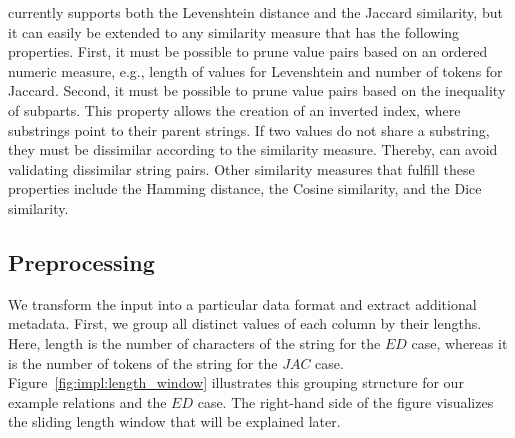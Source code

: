 \sawfish currently supports both the Levenshtein distance and the Jaccard similarity, but it can easily be extended to any similarity measure that has the following properties.
First, it must be possible to prune value pairs based on an ordered numeric measure, e.g., length of values for Levenshtein and number of tokens for Jaccard.
Second, it must be possible to prune value pairs based on the inequality of subparts.
This property allows the creation of an inverted index, where substrings point to their parent strings.
If two values do not share a substring, they must be dissimilar according to the similarity measure.
Thereby, \sawfish can avoid validating dissimilar string pairs. 
Other similarity measures that fulfill these properties include the Hamming distance, the Cosine similarity, and the Dice similarity.
%
%

\subsection{Preprocessing}
\label{section:sawfish:preprocessing}
We transform the input into a particular data format and extract additional metadata.
First, we group all distinct values of each column by their lengths.
Here, length is the number of characters of the
string for the $ED$ case, whereas it is the number of tokens of the string for the $JAC$ case. Figure~\ref{fig:impl:length_window} illustrates this grouping structure for our example relations and the $ED$ case.
The right-hand side of the figure visualizes the sliding length window that will be explained later. 

